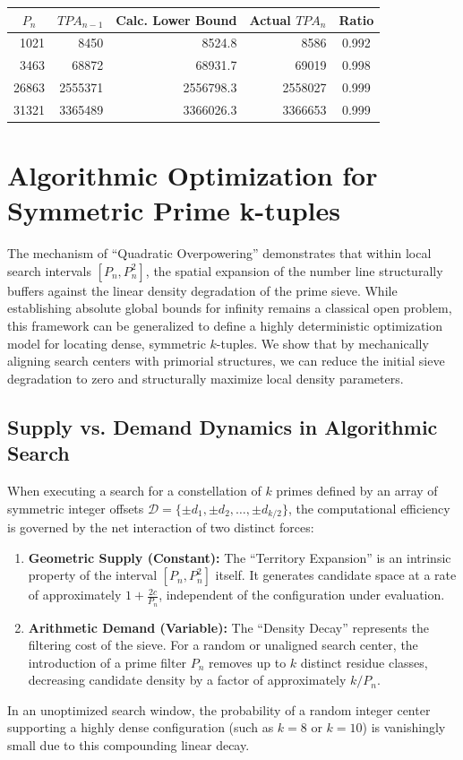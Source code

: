 \documentclass[sn-mathphys-num, pdflatex]{sn-jnl}
\begin{document}
\begin{center}
\begin{tabular}{rrrrc}
\toprule
\multicolumn{1}{c}{$P_n$} & \multicolumn{1}{c}{$TPA_{n-1}$} & \multicolumn{1}{c}{Calc. Lower Bound} & \multicolumn{1}{c}{Actual $TPA_n$} & \multicolumn{1}{c}{Ratio} \\
\midrule
1021 & 8450 & 8524.8 & 8586 & 0.992 \\
3463 & 68872 & 68931.7 & 69019 & 0.998 \\
26863 & 2555371 & 2556798.3 & 2558027 & 0.999 \\
31321 & 3365489 & 3366026.3 & 3366653 & 0.999 \\
\bottomrule
\end{tabular}
\end{center}

\section{Algorithmic Optimization for Symmetric Prime k-tuples}

The mechanism of ``Quadratic Overpowering'' demonstrates that within local search intervals $[P_n, P_n^2]$, the spatial expansion of the number line structurally buffers against the linear density degradation of the prime sieve. While establishing absolute global bounds for infinity remains a classical open problem, this framework can be generalized to define a highly deterministic optimization model for locating dense, symmetric $k$-tuples. We show that by mechanically aligning search centers with primorial structures, we can reduce the initial sieve degradation to zero and structurally maximize local density parameters.

\subsection{Supply vs. Demand Dynamics in Algorithmic Search}
When executing a search for a constellation of $k$ primes defined by an array of symmetric integer offsets $\mathcal{D} = \{\pm d_1, \pm d_2, \dots, \pm d_{k/2}\}$, the computational efficiency is governed by the net interaction of two distinct forces:
\begin{enumerate}
    \item \textbf{Geometric Supply (Constant):} The ``Territory Expansion'' is an intrinsic property of the interval $[P_{n}, P_{n}^{2}]$ itself. It generates candidate space at a rate of approximately $1+\frac{2c}{P_n}$, independent of the configuration under evaluation.
    \item \textbf{Arithmetic Demand (Variable):} The ``Density Decay'' represents the filtering cost of the sieve. For a random or unaligned search center, the introduction of a prime filter $P_n$ removes up to $k$ distinct residue classes, decreasing candidate density by a factor of approximately $k/P_n$.
\end{enumerate}
In an unoptimized search window, the probability of a random integer center supporting a highly dense configuration (such as $k=8$ or $k=10$) is vanishingly small due to this compounding linear decay.
\end{document}
